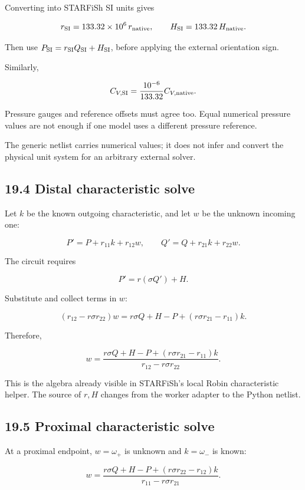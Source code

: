\documentclass[11pt,a4paper]{article}
\begin{document}
Converting into STARFiSh SI units gives


\begingroup\small
\[
r_{\rm SI}=133.32\times10^6\,r_{\rm native},
\qquad
H_{\rm SI}=133.32\,H_{\rm native}.
\]
\endgroup


Then use \(P_{\rm SI}=r_{\rm SI}Q_{\rm SI}+H_{\rm SI}\), before applying the external orientation sign.

Similarly,


\begingroup\small
\[
C_{V,\rm SI}
=\frac{10^{-6}}{133.32}C_{V,\rm native}.
\]
\endgroup


Pressure gauges and reference offsets must agree too. Equal numerical pressure values are not enough if one model uses a different pressure reference.

The generic netlist carries numerical values; it does not infer and convert the physical unit system for an arbitrary external solver.

\subsection{19.4 Distal characteristic solve}
Let \(k\) be the known outgoing characteristic, and let \(w\) be the unknown incoming one:


\begingroup\small
\[
P'=P+r_{11}k+r_{12}w,
\qquad
Q'=Q+r_{21}k+r_{22}w.
\]
\endgroup


The circuit requires


\begingroup\small
\[
P'=r(\sigma Q')+H.
\]
\endgroup


Substitute and collect terms in \(w\):


\begingroup\small
\[
(r_{12}-r\sigma r_{22})w
=
r\sigma Q+H-P
+(r\sigma r_{21}-r_{11})k.
\]
\endgroup


Therefore,


\begingroup\small
\[
w=
\frac{
r\sigma Q+H-P
+(r\sigma r_{21}-r_{11})k
}{
r_{12}-r\sigma r_{22}
}.
\]
\endgroup


This is the algebra already visible in STARFiSh's local Robin characteristic helper. The source of \(r,H\) changes from the worker adapter to the Python netlist.

\subsection{19.5 Proximal characteristic solve}
At a proximal endpoint, \(w=\omega_+\) is unknown and \(k=\omega_-\) is known:


\begingroup\small
\[
w=
\frac{
r\sigma Q+H-P
+(r\sigma r_{22}-r_{12})k
}{
r_{11}-r\sigma r_{21}
}.
\]
\endgroup
\end{document}
